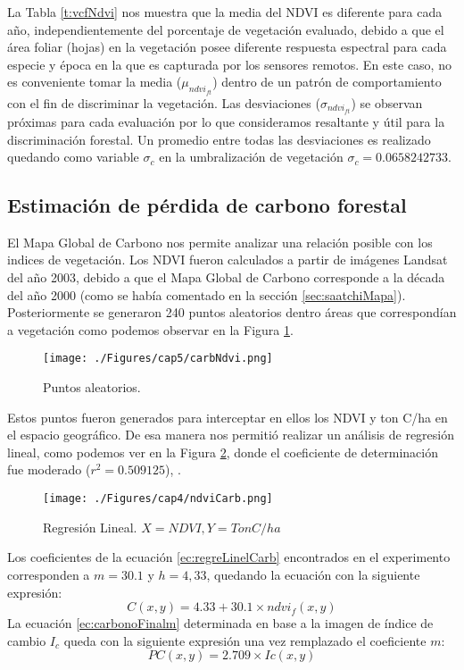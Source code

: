 La Tabla \ref{t:vcfNdvi} nos muestra que la media del NDVI es diferente para cada a\~{n}o, independientemente del porcentaje de vegetaci\'on evaluado, debido a que el \'area foliar (hojas) en la vegetaci\'on posee diferente respuesta espectral para cada especie y \'epoca en la que es capturada por los sensores remotos. En este caso, no es conveniente tomar la media ($  \mu_{ndvi_{ft}} $) dentro de un patr\'on de comportamiento con el fin de discriminar la vegetaci\'on. Las desviaciones ($ \sigma_{ndvi_{ft}} $) se observan pr\'oximas para cada evaluaci\'on por lo que consideramos resaltante y \'util para la discriminaci\'on forestal. Un promedio entre todas las desviaciones es realizado quedando como variable $ \sigma_{c} $ en la umbralizaci\'on de vegetaci\'on  $ \sigma_{c} = 0.0658242733 $.
\subsection{Estimaci\'on de p\'erdida de carbono forestal}\label{subsec:estimacionCarbono}
El Mapa Global de Carbono nos permite analizar una relaci\'on posible con los indices de vegetaci\'on. Los NDVI fueron calculados a partir de im\'agenes Landsat del a\~{n}o 2003, debido a que el Mapa Global de Carbono corresponde a la d\'ecada del a\~{n}o 2000 (como se hab\'ia comentado en la secci\'on \ref{sec:saatchiMapa}). Posteriormente se generaron 240 puntos aleatorios dentro \'areas que correspond\'ian a vegetaci\'on como podemos observar en la Figura \ref{fig:aleatorioCrb}.
\begin{figure}[H]
	\centering
	\texttt{[image: ./Figures/cap5/carbNdvi.png]}
	\caption{Puntos aleatorios.}
	\label{fig:aleatorioCrb}
\end{figure}
Estos puntos fueron generados para interceptar en ellos los NDVI y ton C/ha en el espacio geogr\'afico. De esa manera nos permiti\'o realizar un an\'alisis de regresi\'on lineal, como podemos ver en la Figura \ref{fig:linealCar}, donde el coeficiente de determinaci\'on fue moderado ($ r^{2}=0.509125 $), .
\begin{figure}[H]
	\centering
	\texttt{[image: ./Figures/cap4/ndviCarb.png]}
	\caption{Regresi\'on Lineal. $ X=NDVI, Y=TonC/ha $}
	\label{fig:linealCar}
\end{figure}
Los coeficientes de la ecuaci\'on \ref{ec:regreLinelCarb} encontrados en el experimento corresponden a $ m=30.1 $ y $ h =4,33 $, quedando la ecuaci\'on con la siguiente expresi\'on:
\begin{equation}\label{ec:regreLinelCarbExp}
C(x,y)=4.33+30.1 \times ndvi_{f}(x,y)
\end{equation}
La ecuaci\'on \ref{ec:carbonoFinalm} determinada en base a la imagen de \'indice de cambio $ I_{c} $ queda con la siguiente expresi\'on una vez remplazado el coeficiente $ m $:
 \begin{equation}\label{ec:carbonoFinalmExp}
 PC(x,y) = 2.709 \times Ic(x,y)
 \end{equation}


